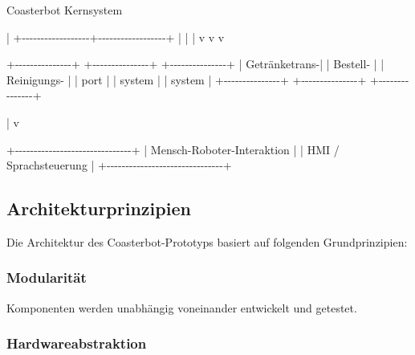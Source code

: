 \documentclass[
  a4paper,
  12pt,
  DIV=12,        %
  parskip=half,  %
  headings=small %
]{scrartcl}
\theoremstyle{definition}
\theoremstyle{definition}
\newenvironment{Shaded}{}{}
\newcommand{\NormalTok}[1]{#1}
\begin{document}
\begin{Shaded}
\begin{Highlighting}[]
\NormalTok{                    Coasterbot Kernsystem}

\NormalTok{                           |}
\NormalTok{        +{-}{-}{-}{-}{-}{-}{-}{-}{-}{-}{-}{-}{-}{-}{-}{-}{-}{-}+{-}{-}{-}{-}{-}{-}{-}{-}{-}{-}{-}{-}{-}{-}{-}{-}{-}{-}+}
\NormalTok{        |                  |                  |}
\NormalTok{        v                  v                  v}

\NormalTok{+{-}{-}{-}{-}{-}{-}{-}{-}{-}{-}{-}{-}{-}{-}{-}+  +{-}{-}{-}{-}{-}{-}{-}{-}{-}{-}{-}{-}{-}{-}{-}+  +{-}{-}{-}{-}{-}{-}{-}{-}{-}{-}{-}{-}{-}{-}{-}+}
\NormalTok{| Getränketrans{-}|  | Bestell{-}      |  | Reinigungs{-}   |}
\NormalTok{| port          |  | system        |  | system        |}
\NormalTok{+{-}{-}{-}{-}{-}{-}{-}{-}{-}{-}{-}{-}{-}{-}{-}+  +{-}{-}{-}{-}{-}{-}{-}{-}{-}{-}{-}{-}{-}{-}{-}+  +{-}{-}{-}{-}{-}{-}{-}{-}{-}{-}{-}{-}{-}{-}{-}+}

\NormalTok{        |}
\NormalTok{        v}

\NormalTok{+{-}{-}{-}{-}{-}{-}{-}{-}{-}{-}{-}{-}{-}{-}{-}{-}{-}{-}{-}{-}{-}{-}{-}{-}{-}{-}{-}{-}{-}{-}{-}+}
\NormalTok{| Mensch{-}Roboter{-}Interaktion    |}
\NormalTok{| HMI / Sprachsteuerung         |}
\NormalTok{+{-}{-}{-}{-}{-}{-}{-}{-}{-}{-}{-}{-}{-}{-}{-}{-}{-}{-}{-}{-}{-}{-}{-}{-}{-}{-}{-}{-}{-}{-}{-}+}
\end{Highlighting}
\end{Shaded}

\subsection{Architekturprinzipien}\label{architekturprinzipien}

Die Architektur des Coasterbot-Prototyps basiert auf folgenden
Grundprinzipien:

\subsubsection{Modularität}\label{modularituxe4t-1}

Komponenten werden unabhängig voneinander entwickelt und getestet.

\subsubsection{Hardwareabstraktion}\label{hardwareabstraktion-1}
\end{document}
